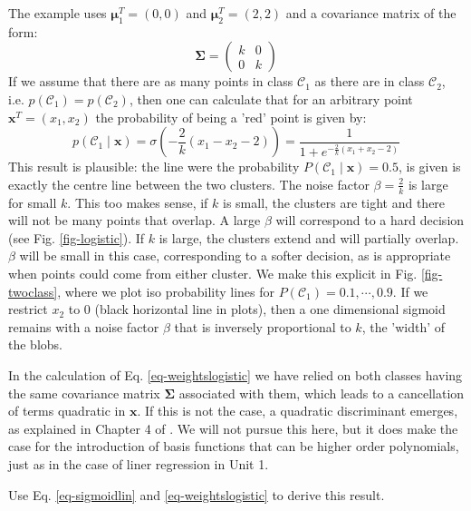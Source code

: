    The example uses $\boldsymbol{\mu}^T_1 = (0, 0)$ and $\boldsymbol{\mu}^T_2 = (2, 2)$ and a covariance matrix of the form:
   $$
   \boldsymbol{\Sigma} = \left( \begin{array}{cc} k & 0 \\ 0 & k \end{array} \right)
   $$
   If we assume that there are as many points in class $\mathcal{C}_1$ as there are in class $\mathcal{C}_2$, i.e. $p(\mathcal{C}_1) = p (\mathcal{C}_2)$, then
   one can calculate that for an arbitrary point $\boldsymbol{x}^T = (x_1, x_2)$ the probability of being a 'red' point is given by:
   \begin{equation}
     p(\mathcal{C}_1\mid \boldsymbol{x}) = \sigma( -\frac{2}{k}(x_1 - x_2 -2)) = \frac{1}{1 + e^{-\frac{2}{k}(x_1 + x_2 -2)}}
     \label{eq-sigmoid2d}
   \end{equation}
   This result is plausible: the line were the probability $P(\mathcal{C}_1 \mid \boldsymbol{x}) = 0.5$, is given is exactly the centre line between the two clusters. The
   noise factor $\beta = \frac{2}{k}$ is large for small $k$. This too makes sense, if $k$ is small, the clusters are tight and there will not be many points that
   overlap. A large $\beta$ will correspond to a hard decision (see Fig. \ref{fig-logistic}). If $k$ is large, the clusters extend and will partially overlap. $\beta$ will
   be small in this case, corresponding to a softer decision, as is appropriate when points could come from either cluster. We make this explicit in Fig. \ref{fig-twoclass},
   where we plot iso probability lines for $P(\mathcal{C}_1) = 0.1, \cdots, 0.9$. If we restrict $x_2$ to 0 (black horizontal line in plots), then a one dimensional
   sigmoid remains with a  noise factor $\beta$ that is inversely proportional to $k$, the 'width' of the blobs.

   In the calculation of Eq. \ref{eq-weightslogistic} we have relied on both classes having the same covariance matrix $\boldsymbol{\Sigma}$ associated with them,
   which leads to a cancellation of terms quadratic in $\boldsymbol{x}$.
   If this is not the case, a quadratic discriminant emerges, as explained in Chapter 4 of \citet{bishop2006}. We will not pursue this here, but it does
   make the case for the introduction of basis functions that can be higher order polynomials, just as in the case of liner regression in Unit 1.



      Use Eq. \ref{eq-sigmoidlin} and \ref{eq-weightslogistic} to derive this result.


